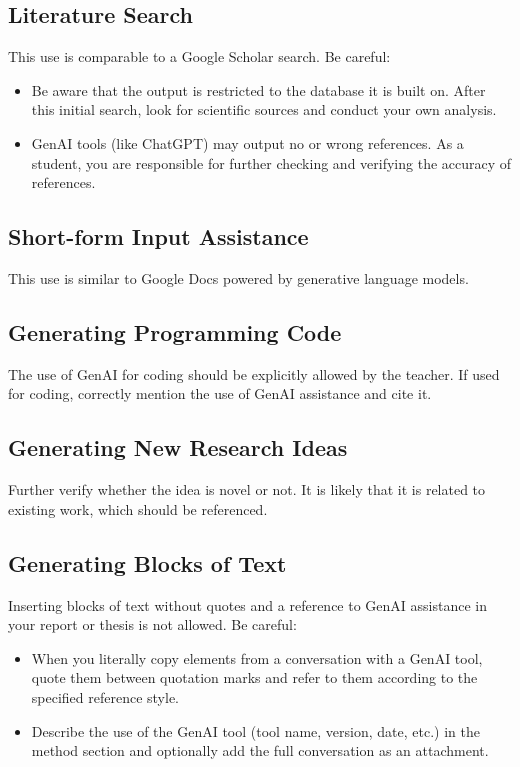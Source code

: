 \subsection*{Literature Search}
This use is comparable to a Google Scholar search. Be careful:
\begin{itemize}
    \item Be aware that the output is restricted to the database it is built on. After this initial search, look for scientific sources and conduct your own analysis.
    \item GenAI tools (like ChatGPT) may output no or wrong references. As a student, you are responsible for further checking and verifying the accuracy of references.
\end{itemize}

\subsection*{Short-form Input Assistance}
This use is similar to Google Docs powered by generative language models.

\subsection*{Generating Programming Code}
The use of GenAI for coding should be explicitly allowed by the teacher. If used for coding, correctly mention the use of GenAI assistance and cite it.

\subsection*{Generating New Research Ideas}
Further verify whether the idea is novel or not. It is likely that it is related to existing work, which should be referenced.

\subsection*{Generating Blocks of Text}
Inserting blocks of text without quotes and a reference to GenAI assistance in your report or thesis is not allowed. Be careful:
\begin{itemize}
    \item When you literally copy elements from a conversation with a GenAI tool, quote them between quotation marks and refer to them according to the specified reference style.
    \item Describe the use of the GenAI tool (tool name, version, date, etc.) in the method section and optionally add the full conversation as an attachment.
\end{itemize}

